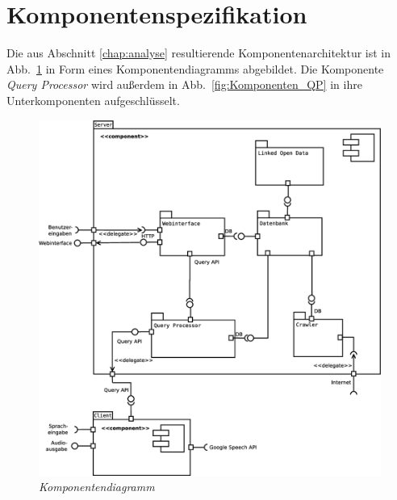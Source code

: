 \section{Komponentenspezifikation}



Die aus Abschnitt \ref{chap:analyse} resultierende Komponentenarchitektur ist in Abb.~\ref{fig:Komponenten} in Form eines Komponentendiagramms abgebildet. Die Komponente \textit{Query Processor} wird außerdem in Abb.~\ref{fig:Komponenten_QP} in ihre Unterkomponenten aufgeschlüsselt.

\begin{figure}
\centering
\includegraphics[width=1\linewidth]{Systementwurf/05_implementierungsentwurf/komponenten}
\caption{\textit{\NewsGenie Komponentendiagramm}}
\label{fig:Komponenten}
\end{figure}


